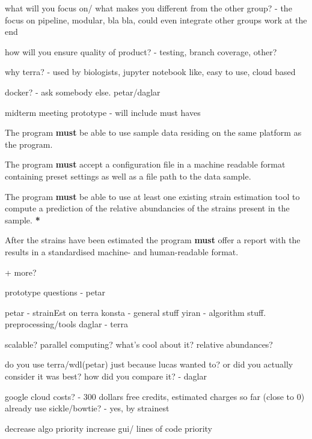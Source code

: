 what will you focus on/
what makes you different from the other group?
- the focus on pipeline, modular, bla bla, could even integrate other groups work at the end

how will you ensure quality of product?
- testing, branch coverage, other?

why terra? - used by biologists, jupyter notebook like, easy to use, cloud based

docker? - ask somebody else. petar/daglar

midterm meeting prototype - will include must haves

\item The program \textbf{must} be able to use sample data residing on the same platform as the program.
\item The program \textbf{must} accept a configuration file in a machine readable format containing preset settings as well as a file path to the data sample.
\item The program \textbf{must} be able to use at least one existing strain estimation tool to compute a prediction of the relative abundancies of the strains present in the sample. \textbf{*}
\item After the strains have been estimated the program \textbf{must} offer a report with the results in a standardised machine- and human-readable format.

+ more?

prototype questions - petar

petar - strainEst on terra
konsta - general stuff
yiran - algorithm stuff. preprocessing/tools
daglar - terra

scalable?
parallel computing?
what's cool about it?
relative abundances?

do you use terra/wdl(petar) just because lucas wanted to? or did you actually consider it was best?
how did you compare it? - daglar 

google cloud costs?   - 300 dollars free credits, estimated charges so far (close to 0)
already use sickle/bowtie?  - yes, by strainest               

decrease algo priority
increase gui/ lines of code priority

